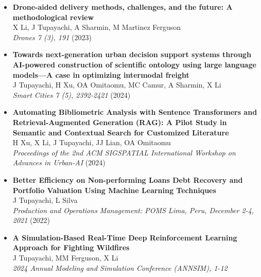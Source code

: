 \documentclass[10pt, letterpaper]{article}
\begin{document}
\begin{itemize}[left=0pt] %
    \item \textbf{Drone-aided delivery methods, challenges, and the future: A methodological review} \\
    X Li, J Tupayachi, A Sharmin, M Martinez Ferguson \\
    \textit{Drones 7 (3), 191} (2023) \\

    \item \textbf{Towards next-generation urban decision support systems through AI-powered construction of scientific ontology using large language models—A case in optimizing intermodal freight} \\
    J Tupayachi, H Xu, OA Omitaomu, MC Camur, A Sharmin, X Li \\
    \textit{Smart Cities 7 (5), 2392-2421} (2024) \\

    \item \textbf{Automating Bibliometric Analysis with Sentence Transformers and Retrieval-Augmented Generation (RAG): A Pilot Study in Semantic and Contextual Search for Customized Literature} \\
    H Xu, X Li, J Tupayachi, JJ Lian, OA Omitaomu \\
    \textit{Proceedings of the 2nd ACM SIGSPATIAL International Workshop on Advances in Urban-AI} (2024) \\

    \item \textbf{Better Efficiency on Non-performing Loans Debt Recovery and Portfolio Valuation Using Machine Learning Techniques} \\
    J Tupayachi, L Silva \\
    \textit{Production and Operations Management: POMS Lima, Peru, December 2-4, 2021} (2022) \\


    \item \textbf{A Simulation-Based Real-Time Deep Reinforcement Learning Approach for Fighting Wildfires} \\
    J Tupayachi, MM Ferguson, X Li \\
    \textit{2024 Annual Modeling and Simulation Conference (ANNSIM), 1-12} \\
\end{itemize}
\end{document}
